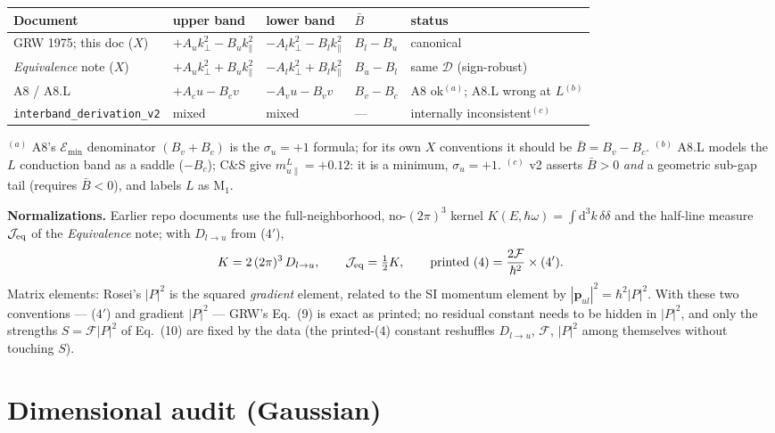 \documentclass[11pt,a4paper]{article}
\numberwithin{equation}{section}
\newcommand{\hw}{\hbar\omega}
\newcommand{\cD}{\mathcal{D}}
\newcommand{\cF}{\mathcal{F}}
\newcommand{\Bb}{\bar{B}}
\newcommand{\kperp}{k_{\perp}}
\newcommand{\kpar}{k_{\parallel}}
\newcommand{\pul}{\mathbf{p}_{ul}}
\newcommand{\dd}{\mathrm{d}}
\newcommand{\Dlu}{D_{l\to u}}
\begin{document}
\begin{center}
\footnotesize
\setlength{\tabcolsep}{4pt}
\begin{tabular}{lllll}
\toprule
Document & upper band & lower band & $\Bb$ & status\\
\midrule
GRW 1975; this doc ($X$) &
$+A_u\kperp^2-B_u\kpar^2$ & $-A_l\kperp^2-B_l\kpar^2$ &
$B_l-B_u$ & canonical\\
\emph{Equivalence} note ($X$) &
$+A_u\kperp^2+B_u\kpar^2$ & $-A_l\kperp^2+B_l\kpar^2$ &
$B_u-B_l$ & same $\cD$ (sign-robust)\\
A8 / A8.L &
$+A_c u-B_c v$ & $-A_v u-B_v v$ & $B_v-B_c$ &
A8 ok$^{(a)}$; A8.L wrong at $L$$^{(b)}$\\
\texttt{interband\_derivation\_v2} & mixed & mixed & --- &
internally inconsistent$^{(c)}$\\
\bottomrule
\end{tabular}
\end{center}
{\footnotesize
$^{(a)}$ A8's $\mathcal{E}_{\min}$ denominator $(B_v{+}B_c)$ is the
$\sigma_u{=}{+}1$ formula; for its own $X$ conventions it should be
$\Bb=B_v{-}B_c$.\quad
$^{(b)}$ A8.L models the $L$ conduction band as a saddle ($-B_c$);
C\&S give $m_{u\parallel}^L=+0.12$: it is a minimum, $\sigma_u=+1$.\quad
$^{(c)}$ v2 asserts $\Bb>0$ \emph{and} a geometric sub-gap tail
(requires $\Bb<0$), and labels $L$ as M$_1$.}

\medskip
\noindent\textbf{Normalizations.}  Earlier repo documents use the
full-neighborhood, no-$(2\pi)^3$ kernel
$K(E,\hw)=\int\dd^3k\,\delta\delta$ and the half-line measure
$\mathcal J_{\rm eq}$ of the \emph{Equivalence} note; with $\Dlu$ from
($4'$),
\begin{equation}
K=2\,(2\pi)^3\,\Dlu,\qquad
\mathcal J_{\rm eq}=\tfrac12 K,\qquad
\text{printed (4)}=\frac{2\cF}{\hbar^2}\times(4') .
\end{equation}
Matrix elements: Rosei's $|P|^2$ is the squared \emph{gradient}
element, related to the SI momentum element by
$|\pul|^2=\hbar^2|P|^2$.  With these two conventions --- ($4'$) and
gradient $|P|^2$ --- GRW's Eq.~(9) is exact as printed; no residual
constant needs to be hidden in $|P|^2$, and only the strengths
$S=\cF|P|^2$ of Eq.~(10) are fixed by the data (the printed-(4)
constant reshuffles $\Dlu$, $\cF$, $|P|^2$ among themselves without
touching $S$).

\section{Dimensional audit (Gaussian)}\label{app:dim}
\end{document}
